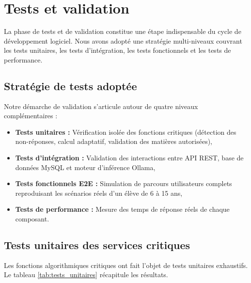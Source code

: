 \documentclass[12pt,a4paper]{report}
\begin{document}
\section{Tests et validation}
La phase de tests et de validation constitue une étape indispensable du cycle de développement logiciel. Nous avons adopté une stratégie multi-niveaux couvrant les tests unitaires, les tests d'intégration, les tests fonctionnels et les tests de performance.

\subsection{Stratégie de tests adoptée}
Notre démarche de validation s'articule autour de quatre niveaux complémentaires :
\begin{itemize}
  \item[—] \textbf{Tests unitaires :} Vérification isolée des fonctions critiques (détection des non-réponses, calcul adaptatif, validation des matières autorisées),
  \item[—] \textbf{Tests d'intégration :} Validation des interactions entre API REST, base de données MySQL et moteur d'inférence Ollama,
  \item[—] \textbf{Tests fonctionnels E2E :} Simulation de parcours utilisateurs complets reproduisant les scénarios réels d'un élève de 6 à 15 ans,
  \item[—] \textbf{Tests de performance :} Mesure des temps de réponse réels de chaque composant.
\end{itemize}

\subsection{Tests unitaires des services critiques}
Les fonctions algorithmiques critiques ont fait l'objet de tests unitaires exhaustifs. Le tableau \ref{tab:tests_unitaires} récapitule les résultats.
\end{document}
